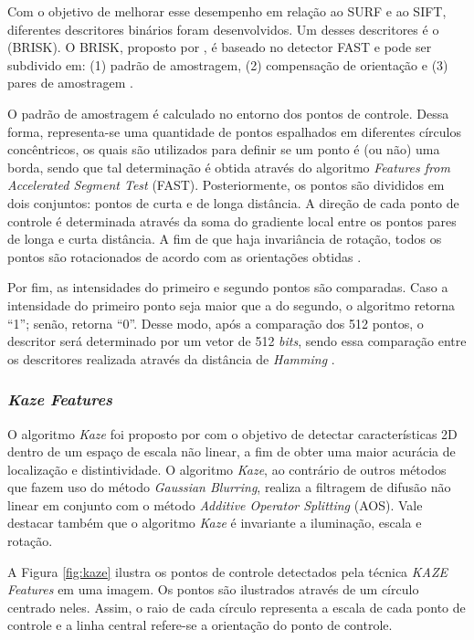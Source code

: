 \documentclass[12pt]{article}
\begin{document}
Com o objetivo de melhorar esse desempenho em relação ao SURF e ao SIFT, diferentes descritores binários foram desenvolvidos. Um desses descritores é o (BRISK). O BRISK, proposto por \cite{brisk}, é baseado no detector FAST e pode ser subdivido em: (1) padrão de amostragem, (2) compensação de orientação e (3) pares de amostragem \cite{featuresDetectors}.

O padrão de amostragem é calculado no entorno dos pontos de controle. Dessa forma, representa-se uma quantidade de pontos espalhados em diferentes círculos concêntricos, os quais são utilizados para definir se um ponto é (ou não) uma borda, sendo que tal determinação é obtida através do algoritmo \textit{Features from Accelerated Segment Test} (FAST). Posteriormente, os pontos são divididos em dois conjuntos: pontos de curta e de longa distância. A direção de cada ponto de controle é determinada através da soma do gradiente local entre os pontos pares de longa e curta distância. A fim de que haja invariância de rotação, todos os pontos são rotacionados de acordo com as orientações obtidas \cite{b3, fast}.

Por fim, as intensidades do primeiro e segundo pontos são comparadas. Caso a intensidade do primeiro ponto seja maior que a do segundo, o algoritmo retorna ``1''; senão, retorna ``0''. Desse modo, após a comparação dos 512 pontos, o descritor será determinado por um vetor de 512 \textit{bits}, sendo essa comparação entre os descritores realizada através da distância de \textit{Hamming} \cite{brisk}. 

\subsubsection{\textit{Kaze Features}}

O algoritmo \textit{Kaze} foi proposto por \cite{b5} com o objetivo de detectar características 2D dentro de um espaço de escala não linear, a fim de obter uma maior acurácia de localização e distintividade. O algoritmo \textit{Kaze}, ao contrário de outros métodos que fazem uso do método \textit{Gaussian Blurring}, realiza a filtragem de difusão não linear em conjunto com o método \textit{Additive Operator Splitting} (AOS). Vale destacar também que o algoritmo \textit{Kaze} é invariante a iluminação, escala e rotação.

A Figura \ref{fig:kaze} ilustra os pontos de controle detectados pela técnica \textit{KAZE Features} em uma imagem. Os pontos são ilustrados através de um círculo centrado neles. Assim, o raio de cada círculo representa a escala de cada ponto de controle e a linha central refere-se a orientação do ponto de controle.
\end{document}
